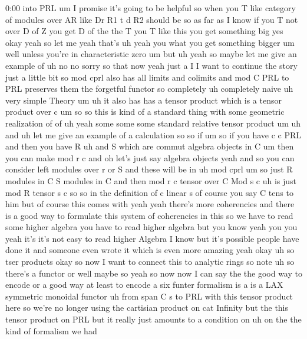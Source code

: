 \begin{unfinished}{0:00}
into  PRL  um  I  promise  it's  going  to  be
helpful  so  when  you  T  like  category  of
modules  over  AR  like  Dr  R1  t  d  R2  should
be  so  as  far  as  I  know  if  you  T  not  over
D  of  Z  you  get  D  of  the  the  T  you  T  like
this  you  get  something  big  yes  okay  yeah
so  let  me  yeah  that's  uh  yeah  you  what
you  get  something  bigger  um  well  unless
you're  in  characteristic  zero  um
but  uh  yeah  so  maybe  let  me  give  an
example  of  uh  no  no  sorry  so  that  now
yeah  just  a  I  I  want  to  continue  the
story  just  a  little  bit  so  mod
cprl  also  has  all  limits  and
colimits  and  mod  C
PRL  to  PRL  preserves  them  the  forgetful
functor
so
completely  uh  completely  naive  uh  very
simple
Theory
um  uh  it  also
has  has  a  tensor
product  which  is  a  tensor  product  over
c
um  so  so  this  is  kind  of  a  standard
thing  with  some  geometric  realization  of
of
uh
yeah  some  some  some  standard  relative
tensor
product
um
uh  and  uh  let  me  give  an  example  of  a
calculation
so
so  if  um  so  if  you  have  c  c
PRL  and  then  you  have
R  uh  and  S  which
are  commut  algebra  objects  in
C  um  then  you  can  make  mod  r  c  and  oh
let's  just  say  algebra  objects  yeah  and
so  you  can  consider  left  modules  over  r
or  S  and  these  will  be  in  uh
mod
cprl  um  so  just  R  modules  in  C  S  modules
in  C  and  then  mod  r  c  tensor  over  C  Mod
s
c  uh  is  just  mod  R  tensor  s  c
so  so  in  the  definition  of  c  linear  s  of
course  you  say  C  tens  to  him  but  of
course  this  comes  with  yeah  yeah  there's
more  coherencies  and  there  is  a  good  way
to  formulate  this  system  of  coherencies
in  this  so  we  have  to  read  some  higher
algebra  you  have  to  read  higher
algebra  but  you  know  yeah  you  you  yeah
it's  it's  not  easy  to  read  higher
Algebra  I  know  but  it's  possible  people
have  done
it  and  someone  even  wrote  it  which  is
even  more
amazing  yeah
okay
uh
so  tser
products  okay  so  now  I  want  to  connect
this
to  analytic  rings  so  note  uh
so  there's  a
functor  or  well  maybe  so  yeah  so  now  now
I  can  say  the  the  good  way  to
encode  or  a  good  way  at  least  to  encode
a  six  funter
formalism  is  a  is  a  LAX  symmetric
monoidal
functor  uh  from  span  C
s  to
PRL  with  this  tensor  product
here  so  we're  no  longer  using  the
cartisian  product  on  cat  Infinity  but
the  this  tensor  product  on  PRL  but  it
really  just  amounts  to  a  condition
on
uh  on  the  the  kind  of  formalism  we  had

\end{unfinished}
